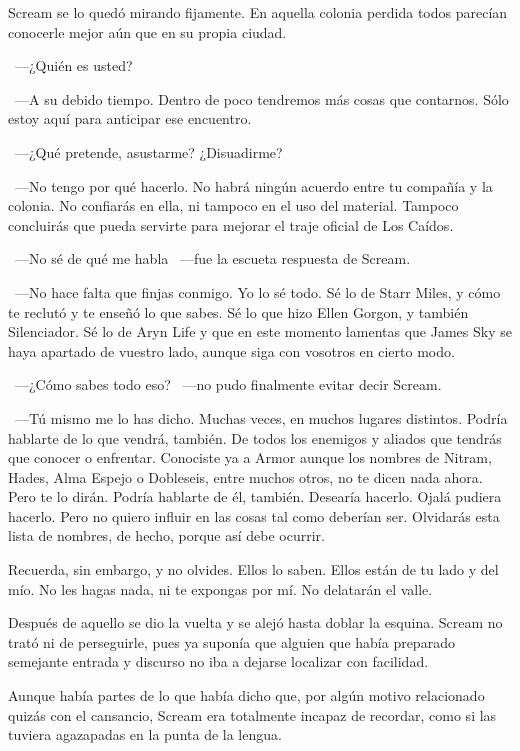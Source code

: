 Scream se lo quedó mirando fijamente. En aquella colonia perdida todos parecían conocerle mejor aún que en su propia ciudad.

~---¿Quién es usted?

~---A su debido tiempo. Dentro de poco tendremos más cosas que contarnos. Sólo estoy aquí para anticipar ese encuentro.

~---¿Qué pretende, asustarme? ¿Disuadirme?

~---No tengo por qué hacerlo. No habrá ningún acuerdo entre tu compañía y la colonia. No confiarás en ella, ni tampoco en el uso del material. Tampoco concluirás que pueda servirte para mejorar el traje oficial de Los Caídos.

~---No sé de qué me habla ~---fue la escueta respuesta de Scream.

~---No hace falta que finjas conmigo. Yo lo sé todo. Sé lo de Starr Miles, y cómo te reclutó y te enseñó lo que sabes. Sé lo que hizo Ellen Gorgon, y también Silenciador. Sé lo de Aryn Life y que en este momento lamentas que James Sky se haya apartado de vuestro lado, aunque siga con vosotros en cierto modo.

~---¿Cómo sabes todo eso? ~---no pudo finalmente evitar decir Scream.

~---Tú mismo me lo has dicho. Muchas veces, en muchos lugares distintos. Podría hablarte de lo que vendrá, también. De todos los enemigos y aliados que tendrás que conocer o enfrentar. Conociste ya a Armor aunque los nombres de Nitram, Hades, Alma Espejo o Dobleseis, entre muchos otros, no te dicen nada ahora. Pero te lo dirán. Podría hablarte de él, también. Desearía hacerlo. Ojalá pudiera hacerlo. Pero no quiero influir en las cosas tal como deberían ser. Olvidarás esta lista de nombres, de hecho, porque así debe ocurrir.

\rquoti{}Recuerda, sin embargo, y no olvides. Ellos lo saben. Ellos están de tu lado y del mío. No les hagas nada, ni te expongas por mí. No delatarán el valle.

Después de aquello se dio la vuelta y se alejó hasta doblar la esquina. Scream no trató ni de perseguirle, pues ya suponía que alguien que había preparado semejante entrada y discurso no iba a dejarse localizar con facilidad.

Aunque había partes de lo que había dicho que, por algún motivo relacionado quizás con el cansancio, Scream era totalmente incapaz de recordar, como si las tuviera agazapadas en la punta de la lengua.\\

